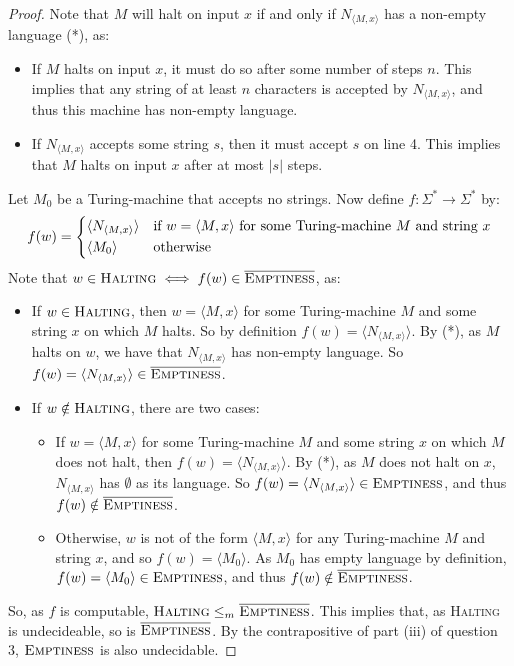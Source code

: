 \documentclass[a4paper,12pt]{scrartcl}
\newcommand{\encode}[1]{\langle #1 \rangle}
\begin{document}
\begin{proof}
    Note that $M$ will halt on input $x$ if and only if $N_{\encode{M, x}}$ has a non-empty language (*), as:
    \begin{itemize}
        \item If $M$ halts on input $x$, it must do so after some number of steps $n$. This implies that any string of at least $n$ characters is accepted by $N_{\encode{M, x}}$, and thus this machine has non-empty language.
        \item If $N_{\encode{M, x}}$ accepts some string $s$, then it must accept $s$ on line 4. This implies that $M$ halts on input $x$ after at most $|s|$ steps.
    \end{itemize}
    Let $M_0$ be a Turing-machine that accepts no strings. Now define $f : \Sigma^* \rightarrow \Sigma^*$ by:
    \begin{equation}
        f(w) =
        \begin{cases*}
            \encode{N_{\encode{M, x}}} & if $w = \encode{M, x}$ for some Turing-machine $M$ and string $x$\\
            \encode{M_0}               & otherwise
        \end{cases*}
    \end{equation}
    Note that $w \in \textsc{Halting} \iff f(w) \in \overline{\textsc{Emptiness}}$, as:
    \begin{itemize}
        \item If $w \in \textsc{Halting}$, then $w = \encode{M, x}$ for some Turing-machine $M$ and some string $x$ on which $M$ halts. So by definition $f(w) = \encode{N_{\encode{M, x}}}$. By (*), as $M$ halts on $w$, we have that $N_{\encode{M, x}}$ has non-empty language. So $f(w) = \encode{N_{\encode{M, x}}} \in \overline{\textsc{Emptiness}}$.
        \item If $w \notin \textsc{Halting}$, there are two cases:
            \begin{itemize}
                \item If $w = \encode{M, x}$ for some Turing-machine $M$ and some string $x$ on which $M$ does not halt, then $f(w) = \encode{N_{\encode{M, x}}}$. By (*), as $M$ does not halt on $x$, $N_{\encode{M, x}}$ has $\emptyset$ as its language. So $f(w) = \encode{N_{\encode{M, x}}} \in \textsc{Emptiness}$, and thus $f(w) \notin \overline{\textsc{Emptiness}}$.
                \item Otherwise, $w$ is not of the form $\encode{M, x}$ for any Turing-machine $M$ and string $x$, and so $f(w) = \encode{M_0}$. As $M_0$ has empty language by definition, $f(w) = \encode{M_0} \in \textsc{Emptiness}$, and thus $f(w) \notin \overline{\textsc{Emptiness}}$.
            \end{itemize}
    \end{itemize}
    So, as $f$ is computable, $\textsc{Halting} \leq_m \overline{\textsc{Emptiness}}$. This implies that, as \textsc{Halting} is undecideable, so is $\overline{\textsc{Emptiness}}$. By the contrapositive of part (iii) of question 3, $\textsc{Emptiness}$ is also undecidable.
\end{proof}
\end{document}
